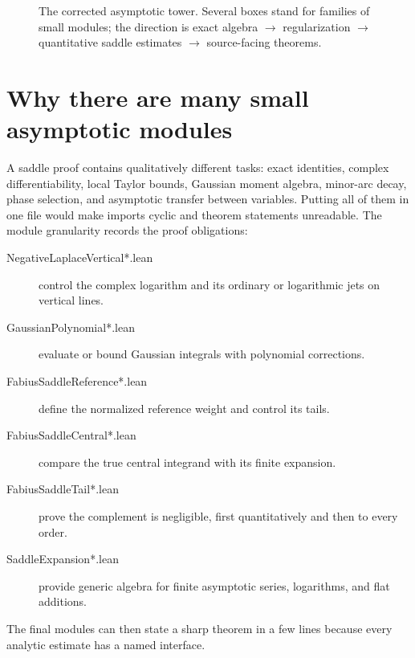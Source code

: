 \documentclass[11pt,a4paper,openany]{book}
\def\module#1{#1.lean}
\newcommand{\module}[1]{\nolinkurl{#1.lean}}
\begin{document}
\begin{figure}[p]
{}
\caption{The corrected asymptotic tower.  Several boxes stand for families of
small modules; the direction is exact algebra $\to$ regularization $\to$
quantitative saddle estimates $\to$ source-facing theorems.}
\label{fig:asymptotic-dag}
\end{figure}

\section{Why there are many small asymptotic modules}
A saddle proof contains qualitatively different tasks: exact identities,
complex differentiability, local Taylor bounds, Gaussian moment algebra,
minor-arc decay, phase selection, and asymptotic transfer between variables.
Putting all of them in one file would make imports cyclic and theorem statements
unreadable.  The module granularity records the proof obligations:
\begin{description}
\item[\module{NegativeLaplaceVertical*}] control the complex logarithm and its
ordinary or logarithmic jets on vertical lines.
\item[\module{GaussianPolynomial*}] evaluate or bound Gaussian integrals with
polynomial corrections.
\item[\module{FabiusSaddleReference*}] define the normalized reference weight
and control its tails.
\item[\module{FabiusSaddleCentral*}] compare the true central integrand with its
finite expansion.
\item[\module{FabiusSaddleTail*}] prove the complement is negligible, first
quantitatively and then to every order.
\item[\module{SaddleExpansion*}] provide generic algebra for finite asymptotic
series, logarithms, and flat additions.
\end{description}
The final modules can then state a sharp theorem in a few lines because every
analytic estimate has a named interface.
\end{document}
